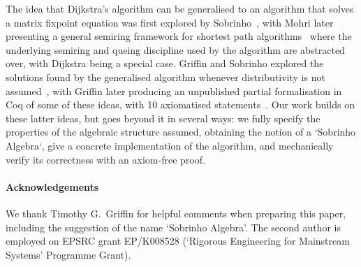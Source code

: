 The idea that Dijkstra's algorithm can be generalised to an algorithm that solves a matrix fixpoint equation was first explored by Sobrinho~\cite{sobrinho_algebra_2001}, with Mohri later presenting a general semiring framework for shortest path algorithms~\cite{mohri:semiring:2002} where the underlying semiring and queing discipline used by the algorithm are abstracted over, with Dijkstra being a special case.
Griffin and Sobrinho explored the solutions found by the generalised algorithm whenever distributivity is not assumed~\cite{sobrinho_routing_2010}, with Griffin later producing an unpublished partial formalisation in Coq of some of these ideas, with 10 axiomatised statements~\cite{griffin:equilibrium-coq}.
Our work builds on these latter ideas, but goes beyond it in several ways: we fully specify the properties of the algebraic structure assumed, obtaining the notion of a `Sobrinho Algebra`, give a concrete implementation of the algorithm, and mechanically verify its correctness with an axiom-free proof.

\paragraph{Acknowledgements} We thank Timothy G.~Griffin for helpful comments when preparing this paper, including the suggestion of the name `Sobrinho Algebra'.
The second author is employed on EPSRC grant EP/K008528 (`Rigorous Engineering for Mainstream Systems' Programme Grant).
